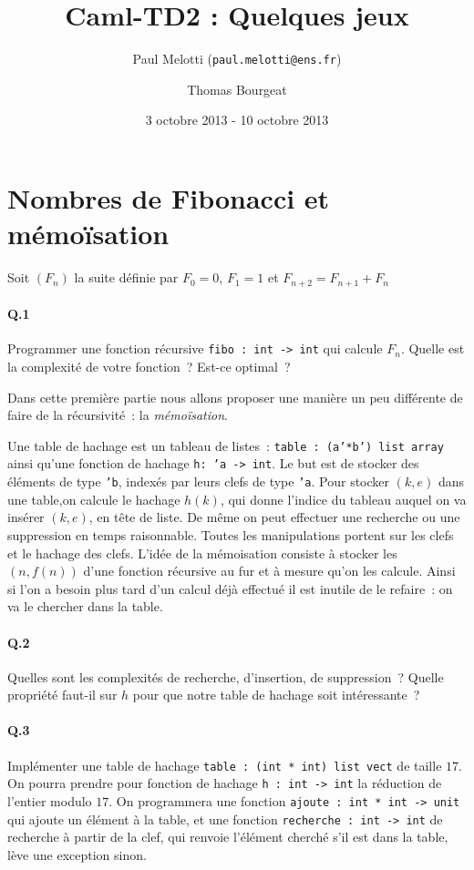 \documentclass[10pt,a4paper]{article}
\begin{document}
\title{Caml-TD2 : Quelques jeux}
\date{3 octobre 2013 - 10 octobre 2013}
\author{Paul Melotti (\texttt{paul.melotti@ens.fr}) \and Thomas Bourgeat}
\maketitle{}

\section{Nombres de Fibonacci et mémoïsation}
Soit $(F_n)$ la suite définie par $F_0=0$, $F_1=1$ et $F_{n+2}=F_{n+1}+F_n$
\paragraph{Q.1} Programmer une fonction récursive \texttt{fibo : int -> int} qui calcule $F_n$. Quelle est la complexité de votre fonction~? Est-ce optimal~?

Dans cette première partie nous allons proposer une manière un peu différente de faire de la récursivité~: la \emph{mémoïsation}.

Une table de hachage est un tableau de listes~: \texttt{table : (a'*b')
list array} ainsi qu'une fonction de hachage \texttt{h: 'a -> int}. Le
but est de stocker des éléments de type \texttt{'b}, indexés par leurs clefs de
type \texttt{'a}. Pour stocker $(k,e)$ dans une table,on calcule le hachage $h(k)$,
qui donne l'indice du tableau auquel on va insérer $(k,e)$, en tête de liste. 
De même on peut effectuer une recherche ou une suppression en temps raisonnable.
Toutes les manipulations portent sur les clefs et le hachage des clefs.
L'idée de la mémoisation consiste à stocker les $(n,f(n))$ d'une fonction
récursive au fur et à mesure qu'on les calcule. Ainsi si l'on a besoin plus tard
d'un calcul déjà effectué il est inutile de le refaire~: on va le
chercher dans la table.

\paragraph{Q.2}Quelles sont les complexités de recherche, d'insertion, de
suppression~? Quelle propriété faut-il sur $h$ pour que notre table de
hachage soit intéressante~?

\paragraph{Q.3} Implémenter une table de hachage \texttt{table : (int * int) list vect} de taille
$17$. On pourra prendre pour fonction de hachage \texttt{h : int -> int} la réduction de l'entier 
modulo $17$. On programmera une fonction \texttt{ajoute : int * int -> unit} qui ajoute
un élément à la table, et une fonction \texttt{recherche : int -> int}
 de recherche à partir de la clef, qui renvoie
l'élément cherché s'il est dans la table, lève une exception sinon.
\end{document}
